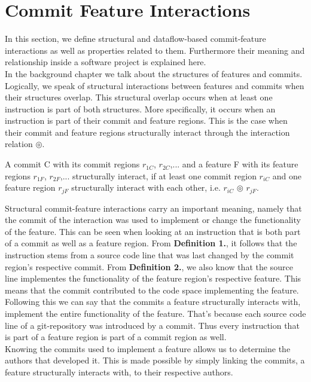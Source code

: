 \section*{Commit Feature Interactions}\label{ch:example_chapter}

In this section, we define structural and dataflow-based commit-feature interactions as well as properties related to them.
Furthermore their meaning and relationship inside a software project is explained here. \\
In the background chapter we talk about the structures of features and commits. 
Logically, we speak of structural interactions between features and commits when their structures overlap. 
This structural overlap occurs when at least one instruction is part of both structures.
More specifically, it occurs when an instruction is part of their commit and feature regions.
This is the case when their commit and feature regions structurally interact through the interaction relation $\circledcirc$.

\begin{definition}
A commit C with its commit regions $r_{1C}$, $r_{2C}$,... and a feature F with its feature regions $r_{1F}$, $r_{2F}$,... structurally interact, if at least one commit region $r_{iC}$ and one feature region $r_{jF}$ structurally interact with each other, i.e. $r_{iC}$ $\circledcirc$ $r_{jF}$.
\end{definition}

Structural commit-feature interactions carry an important meaning, namely that the commit of the interaction was used to implement or change the functionality of the feature.
This can be seen when looking at an instruction that is both part of a commit as well as a feature region.
From \textbf{Definition 1.}, it follows that the instruction stems from a source code line that was last changed by the commit region's respective commit. 
From \textbf{Definition 2.}, we also know that the source line implementes the functionality of the feature region's respective feature. 
This means that the commit contributed to the code space implementing the feature.
Following this we can say that the commits a feature structurally interacts with, implement the entire functionality of the feature.
That's because each source code line of a git-repository was introduced by a commit.
Thus every instruction that is part of a feature region is part of a commit region as well. \\
Knowing the commits used to implement a feature allows us to determine the authors that developed it.
This is made possible by simply linking the commits, a feature structurally interacts with, to their respective authors. \\

